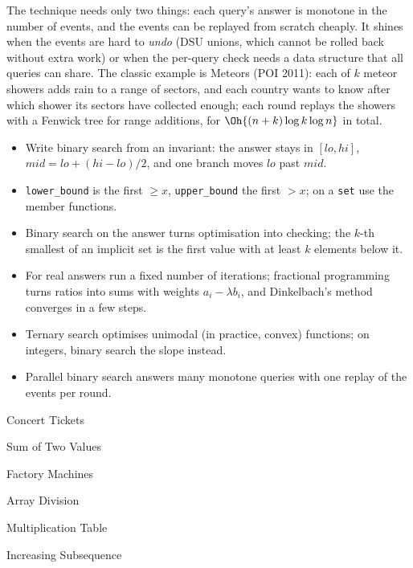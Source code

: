 The technique needs only two things: each query's answer is monotone in the number of events, and the events can be replayed
from scratch cheaply. It shines when the events are hard to \emph{undo} (DSU unions, which cannot be rolled back without extra
work) or when the per-query check needs a data structure that all queries can share. The classic example is Meteors
(POI 2011): each of $k$ meteor showers adds rain to a range of sectors, and each country wants to know after which shower its
sectors have collected enough; each round replays the showers with a Fenwick tree for range additions, for
$\Oh{(n + k)\log k \log n}$ in total.

\begin{summary}
\begin{itemize}
  \item Write binary search from an invariant: the answer stays in $[lo, hi]$, $mid = lo + (hi - lo)/2$, and one branch
        moves $lo$ past $mid$.
  \item \texttt{lower\_bound} is the first $\ge x$, \texttt{upper\_bound} the first $> x$; on a \texttt{set} use the member
        functions.
  \item Binary search on the answer turns optimisation into checking; the $k$-th smallest of an implicit set is the first
        value with at least $k$ elements below it.
  \item For real answers run a fixed number of iterations; fractional programming turns ratios into sums with weights
        $a_i - \lambda b_i$, and Dinkelbach's method converges in a few steps.
  \item Ternary search optimises unimodal (in practice, convex) functions; on integers, binary search the slope instead.
  \item Parallel binary search answers many monotone queries with one replay of the events per round.
\end{itemize}
\end{summary}

\begin{practice}
\begin{pplist}
  \item Concert Tickets
  \item Sum of Two Values
  \item Factory Machines
  \item Array Division
  \item Multiplication Table
  \item Increasing Subsequence
\end{pplist}
\end{practice}
